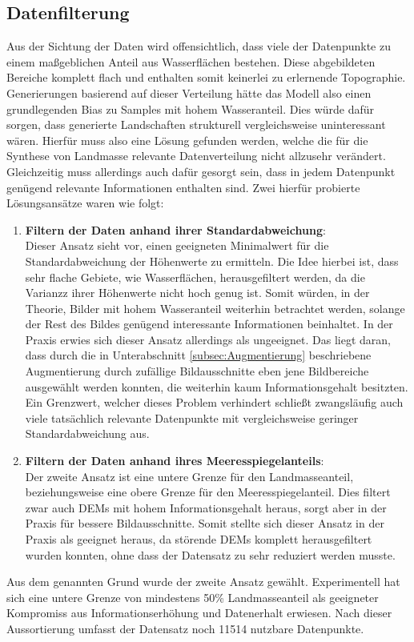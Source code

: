 \subsection{Datenfilterung}

Aus der Sichtung der Daten wird offensichtlich, dass viele der Datenpunkte zu einem maßgeblichen Anteil aus Wasserflächen bestehen. Diese abgebildeten Bereiche komplett flach und enthalten somit keinerlei zu erlernende Topographie. Generierungen basierend auf dieser Verteilung hätte das Modell also einen grundlegenden Bias zu Samples mit hohem Wasseranteil. Dies würde dafür sorgen, dass generierte Landschaften strukturell vergleichsweise uninteressant wären. Hierfür muss also eine Lösung gefunden werden, welche die für die Synthese von Landmasse relevante Datenverteilung nicht allzusehr verändert. Gleichzeitig muss allerdings auch dafür gesorgt sein, dass in jedem Datenpunkt genügend relevante Informationen enthalten sind. Zwei hierfür probierte Lösungsansätze waren wie folgt:
\begin{enumerate}
    \item \textbf{Filtern der Daten anhand ihrer Standardabweichung}: \\
    Dieser Ansatz sieht vor, einen geeigneten Minimalwert für die Standardabweichung der Höhenwerte zu ermitteln. Die Idee hierbei ist, dass sehr flache Gebiete, wie Wasserflächen, herausgefiltert werden, da die Varianzz ihrer Höhenwerte nicht hoch genug ist. Somit würden, in der Theorie, Bilder mit hohem Wasseranteil weiterhin betrachtet werden, solange der Rest des Bildes genügend interessante Informationen beinhaltet. In der Praxis erwies sich dieser Ansatz allerdings als ungeeignet. Das liegt daran, dass durch die in Unterabschnitt \ref{subsec:Augmentierung} beschriebene Augmentierung durch zufällige Bildausschnitte eben jene Bildbereiche ausgewählt werden konnten, die weiterhin kaum Informationsgehalt besitzten. Ein Grenzwert, welcher dieses Problem verhindert schließt zwangsläufig auch viele tatsächlich relevante Datenpunkte mit vergleichsweise geringer Standardabweichung aus.
    \item \textbf{Filtern der Daten anhand ihres Meeresspiegelanteils}: \\
    Der zweite Ansatz ist eine untere Grenze für den Landmasseanteil, beziehungsweise eine obere Grenze für den Meeresspiegelanteil. Dies filtert zwar auch \ac{DEM}s mit hohem Informationsgehalt heraus, sorgt aber in der Praxis für bessere Bildausschnitte. Somit stellte sich dieser Ansatz in der Praxis als geeignet heraus, da störende DEMs komplett herausgefiltert wurden konnten, ohne dass der Datensatz zu sehr reduziert werden musste.
\end{enumerate}
Aus dem genannten Grund wurde der zweite Ansatz gewählt. Experimentell hat sich eine untere Grenze von mindestens 50\% Landmasseanteil als geeigneter Kompromiss aus Informationserhöhung und Datenerhalt erwiesen. Nach dieser Aussortierung umfasst der Datensatz noch 11514 nutzbare Datenpunkte.

